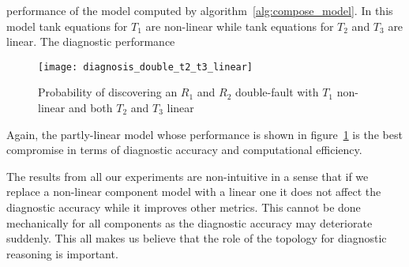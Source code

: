 performance of the model computed by
algorithm~\ref{alg:compose_model}. In this model tank equations for
$T_1$ are non-linear while tank equations for $T_2$ and $T_3$ are
linear. The diagnostic performance
%
\begin{figure}[htb]
  \centering
  \texttt{[image: diagnosis\_double\_t2\_t3\_linear]}
  \caption{Probability of discovering an $R_1$ and $R_2$ double-fault with $T_1$ non-linear and both $T_2$ and $T_3$ linear}
  \label{fig:diagnosis_double_t2_t3_linear}
\end{figure}
\par
%
Again, the partly-linear model whose performance is shown in
figure~\ref{fig:diagnosis_double_t2_t3_linear} is the best
compromise in terms of diagnostic accuracy and computational
efficiency.
\par
The results from all our experiments are non-intuitive in a sense that
if we replace a non-linear component model with a linear one it does
not affect the diagnostic accuracy while it improves other
metrics. This cannot be done mechanically for all components as the
diagnostic accuracy may deteriorate suddenly. This all makes us believe
that the role of the topology for diagnostic reasoning is important.
